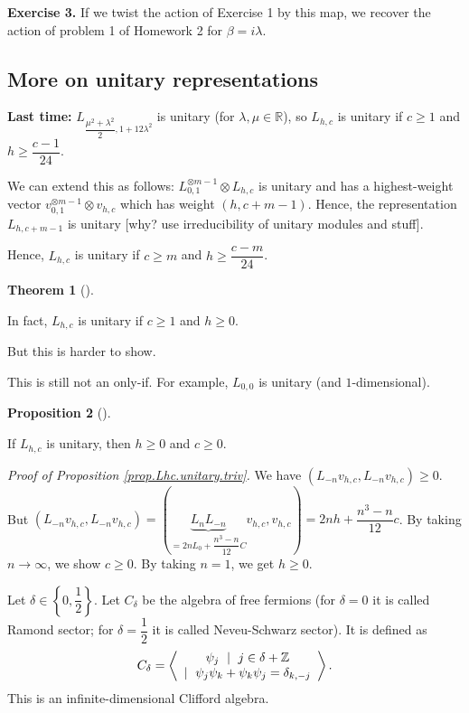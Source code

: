 \documentclass
[numbers=enddot,12pt,final,onecolumn,german,notitlepage]{scrartcl}%
\theoremstyle{definition}
\newtheorem{theo}{Theorem}
\newenvironment{theorem}[1][]
{\begin{theo}[#1]\begin{leftbar}}
{\end{leftbar}\end{theo}}
\newtheorem{prop}[theo]{Proposition}
\newenvironment{proposition}[1][]
{\begin{prop}[#1]\begin{leftbar}}
{\end{leftbar}\end{prop}}
\begin{document}
\textbf{Exercise 3.} If we twist the action of Exercise 1 by this map, we
recover the action of problem 1 of Homework 2 for $\beta=i\lambda$.

\subsection{More on unitary representations}

\textbf{Last time:} $L_{\dfrac{\mu^{2}+\lambda^{2}}{2},1+12\lambda^{2}}$ is
unitary (for $\lambda,\mu\in\mathbb{R}$), so $L_{h,c}$ is unitary if $c\geq1$
and $h\geq\dfrac{c-1}{24}$.

We can extend this as follows: $L_{0,1}^{\otimes m-1}\otimes L_{h,c}$ is
unitary and has a highest-weight vector $v_{0,1}^{\otimes m-1}\otimes v_{h,c}$
which has weight $\left(  h,c+m-1\right)  $. Hence, the representation
$L_{h,c+m-1}$ is unitary [why? use irreducibility of unitary modules and stuff].

Hence, $L_{h,c}$ is unitary if $c\geq m$ and $h\geq\dfrac{c-m}{24}$.

\begin{theorem}
In fact, $L_{h,c}$ is unitary if $c\geq1$ and $h\geq0$.
\end{theorem}

But this is harder to show.

This is still not an only-if. For example, $L_{0,0}$ is unitary (and $1$-dimensional).

\begin{proposition}
\label{prop.Lhc.unitary.triv}If $L_{h,c}$ is unitary, then $h\geq0$ and
$c\geq0$.
\end{proposition}

\textit{Proof of Proposition \ref{prop.Lhc.unitary.triv}.} We have $\left(
L_{-n}v_{h,c},L_{-n}v_{h,c}\right)  \geq0$. But $\left(  L_{-n}v_{h,c}%
,L_{-n}v_{h,c}\right)  =\left(  \underbrace{L_{n}L_{-n}}_{=2nL_{0}%
+\dfrac{n^{3}-n}{12}C}v_{h,c},v_{h,c}\right)  =2nh+\dfrac{n^{3}-n}{12}c$. By
taking $n\rightarrow\infty$, we show $c\geq0$. By taking $n=1$, we get
$h\geq0$.

Let $\delta\in\left\{  0,\dfrac{1}{2}\right\}  $. Let $C_{\delta}$ be the
algebra of free fermions (for $\delta=0$ it is called Ramond sector; for
$\delta=\dfrac{1}{2}$ it is called Neveu-Schwarz sector). It is defined as%
\[
C_{\delta}=\left\langle
\begin{array}
[c]{c}%
\psi_{j}\ \mid\ j\in\delta+\mathbb{Z}\\
\mid\ \psi_{j}\psi_{k}+\psi_{k}\psi_{j}=\delta_{k,-j}%
\end{array}
\right\rangle .
\]
This is an infinite-dimensional Clifford algebra.
\end{document}
